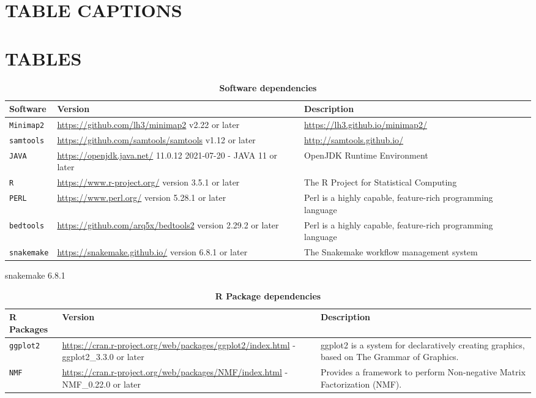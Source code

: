 \documentclass[times, 11pt, a4paper]{article}
\begin{document}
\section*{TABLE CAPTIONS}
\section*{TABLES}

\begin{table}[]
\label{tab:software}
\begin{tabular}{|p{1.5cm}|p{7cm}|p{6.5cm}|}
\hline 
            Software & Version & Description \\ 
            \hline \hline
            \texttt{Minimap2} & \url{https://github.com/lh3/minimap2} v2.22 or later & \url{https://lh3.github.io/minimap2/} \\ \hline
            \texttt{samtools} & \url{https://github.com/samtools/samtools} v1.12 or later & \url{http://samtools.github.io/} \\ \hline
	   \texttt{JAVA} & \url{https://openjdk.java.net/} 11.0.12 2021-07-20 - JAVA 11 or later & OpenJDK Runtime Environment\\ \hline
	   \texttt{R} &  \url{https://www.r-project.org/} version 3.5.1 or later & The R Project for Statistical Computing \\ \hline
	   \texttt{PERL} &  \url{https://www.perl.org/} version 5.28.1 or later & Perl is a highly capable, feature-rich programming language \\ \hline
	   \texttt{bedtools} &  \url{https://github.com/arq5x/bedtools2} version 2.29.2 or later & Perl is a highly capable, feature-rich programming language \\ \hline	   
	   \texttt{snakemake} &  \url{https://snakemake.github.io/} version 6.8.1 or later & The Snakemake workflow management system\\ \hline	   
\end{tabular}
\caption{\textbf{Software dependencies}\label{tab:software}}
\end{table}

snakemake	6.8.1

\begin{table}[]
\label{tab:packages}
\begin{tabular}{|p{1.5cm}|p{7cm}|p{6.5cm}|}
\hline 
            R Packages & Version & Description \\ 
            \hline \hline
            \texttt{ggplot2} & \url{https://cran.r-project.org/web/packages/ggplot2/index.html} - ggplot2\_3.3.0 or later &  ggplot2 is a system for declaratively creating graphics, based on The Grammar of Graphics. \\ \hline
            \texttt{NMF} & \url{https://cran.r-project.org/web/packages/NMF/index.html} - NMF\_0.22.0 or later &  Provides a framework to perform Non-negative Matrix Factorization (NMF). \\ \hline
\end{tabular}
\caption{\textbf{R Package dependencies}\label{tab:software}}
\end{table}
\end{document}
